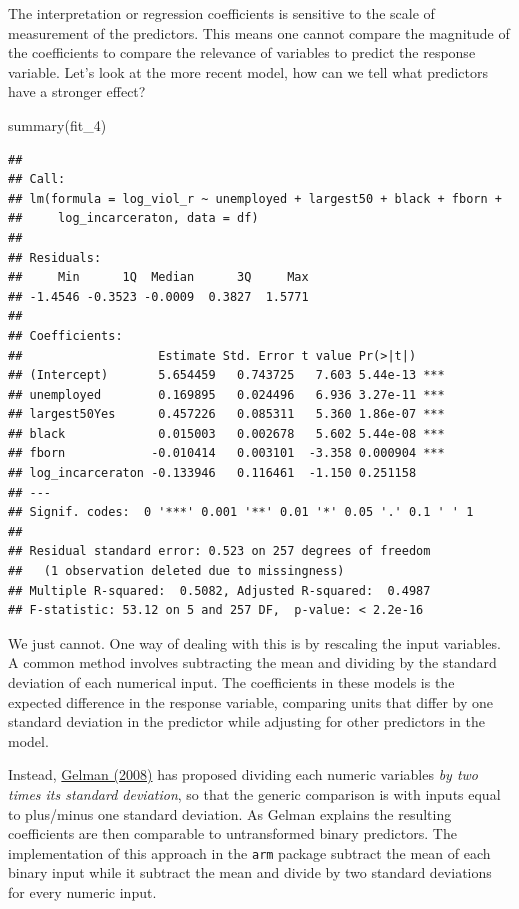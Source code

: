 \documentclass[
]{book}
\newenvironment{Shaded}{\begin{snugshade}}{\end{snugshade}}
\newcommand{\FunctionTok}[1]{\textcolor[rgb]{0.00,0.00,0.00}{#1}}
\newcommand{\NormalTok}[1]{#1}
\begin{document}
The interpretation or regression coefficients is sensitive to the scale of measurement of the predictors. This means one cannot compare the magnitude of the coefficients to compare the relevance of variables to predict the response variable. Let's look at the more recent model, how can we tell what predictors have a stronger effect?

\begin{Shaded}
\begin{Highlighting}[]
\FunctionTok{summary}\NormalTok{(fit\_4)}
\end{Highlighting}
\end{Shaded}

\begin{verbatim}
## 
## Call:
## lm(formula = log_viol_r ~ unemployed + largest50 + black + fborn + 
##     log_incarceraton, data = df)
## 
## Residuals:
##     Min      1Q  Median      3Q     Max 
## -1.4546 -0.3523 -0.0009  0.3827  1.5771 
## 
## Coefficients:
##                   Estimate Std. Error t value Pr(>|t|)    
## (Intercept)       5.654459   0.743725   7.603 5.44e-13 ***
## unemployed        0.169895   0.024496   6.936 3.27e-11 ***
## largest50Yes      0.457226   0.085311   5.360 1.86e-07 ***
## black             0.015003   0.002678   5.602 5.44e-08 ***
## fborn            -0.010414   0.003101  -3.358 0.000904 ***
## log_incarceraton -0.133946   0.116461  -1.150 0.251158    
## ---
## Signif. codes:  0 '***' 0.001 '**' 0.01 '*' 0.05 '.' 0.1 ' ' 1
## 
## Residual standard error: 0.523 on 257 degrees of freedom
##   (1 observation deleted due to missingness)
## Multiple R-squared:  0.5082, Adjusted R-squared:  0.4987 
## F-statistic: 53.12 on 5 and 257 DF,  p-value: < 2.2e-16
\end{verbatim}

We just cannot. One way of dealing with this is by rescaling the input variables. A common method involves subtracting the mean and dividing by the standard deviation of each numerical input. The coefficients in these models is the expected difference in the response variable, comparing units that differ by one standard deviation in the predictor while adjusting for other predictors in the model.

Instead, \href{http://www.stat.columbia.edu/~gelman/research/published/standardizing7.pdf}{Gelman (2008)} has proposed dividing each numeric variables \emph{by two times its standard deviation}, so that the generic comparison is with inputs equal to plus/minus one standard deviation. As Gelman explains the resulting coefficients are then comparable to untransformed binary predictors. The implementation of this approach in the \texttt{arm} package subtract the mean of each binary input while it subtract the mean and divide by two standard deviations for every numeric input.
\end{document}
